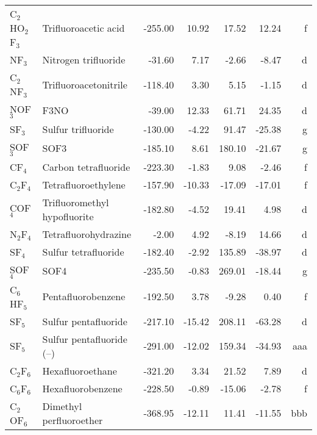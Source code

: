 \begin{table}
\begin{center}
\begin{tabular}{llrrrrr}
 C$_2$HO$_2$F$_3$     & Trifluoroacetic acid            &  -255.00    &    10.92  &    17.52  &    12.24  &      f\\
 NF$_3$         & Nitrogen trifluoride            &   -31.60    &     7.17  &    -2.66  &    -8.47  &      d\\
 C$_2$NF$_3$       & Trifluoroacetonitrile           &  -118.40    &     3.30  &     5.15  &    -1.15  &      d\\
 NOF$_3$        & F3NO                            &   -39.00    &    12.33  &    61.71  &    24.35  &      d\\
 SF$_3$         & Sulfur trifluoride              &  -130.00    &    -4.22  &    91.47  &   -25.38  &      g\\
 SOF$_3$        & SOF3                            &  -185.10    &     8.61  &   180.10  &   -21.67  &      g\\
 CF$_4$         & Carbon tetrafluoride            &  -223.30    &    -1.83  &     9.08  &    -2.46  &      f\\
 C$_2$F$_4$        & Tetrafluoroethylene             &  -157.90    &   -10.33  &   -17.09  &   -17.01  &      f\\
 COF$_4$        & Trifluoromethyl hypofluorite    &  -182.80    &    -4.52  &    19.41  &     4.98  &      d\\
 N$_2$F$_4$        & Tetrafluorohydrazine            &    -2.00    &     4.92  &    -8.19  &    14.66  &      d\\
 SF$_4$         & Sulfur tetrafluoride            &  -182.40    &    -2.92  &   135.89  &   -38.97  &      d\\
 SOF$_4$        & SOF4                            &  -235.50    &    -0.83  &   269.01  &   -18.44  &      g\\
 C$_6$HF$_5$       & Pentafluorobenzene              &  -192.50    &     3.78  &    -9.28  &     0.40  &      f\\
 SF$_5$         & Sulfur pentafluoride            &  -217.10    &   -15.42  &   208.11  &   -63.28  &      d\\
 SF$_5$         & Sulfur pentafluoride (--)        &  -291.00    &   -12.02  &   159.34  &   -34.93  &    aaa\\
 C$_2$F$_6$        & Hexafluoroethane                &  -321.20    &     3.34  &    21.52  &     7.89  &      d\\
 C$_6$F$_6$        & Hexafluorobenzene               &  -228.50    &    -0.89  &   -15.06  &    -2.78  &      f\\
 C$_2$OF$_6$       & Dimethyl perfluoroether         &  -368.95    &   -12.11  &    11.41  &   -11.55  &    bbb\\

\end{tabular}
\end{center}
\end{table}
